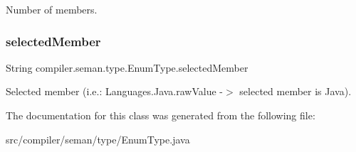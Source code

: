 Number of members. \mbox{\label{classcompiler_1_1seman_1_1type_1_1_enum_type_aaf99c0618eb46bcfee4982085e9b4086}} 
\subsubsection{\texorpdfstring{selected\+Member}{selectedMember}}
{\footnotesize\ttfamily String compiler.\+seman.\+type.\+Enum\+Type.\+selected\+Member}

Selected member (i.\+e.\+: Languages.\+Java.\+raw\+Value -\/$>$ selected member is Java). 

The documentation for this class was generated from the following file\+:\begin{DoxyCompactItemize}
\item 
src/compiler/seman/type/Enum\+Type.\+java\end{DoxyCompactItemize}
